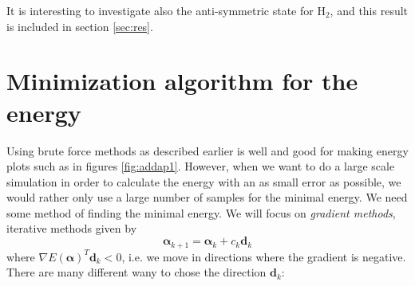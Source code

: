 \documentclass[aps,prc,twocolumn,floatfix]{revtex4}
\def\alphavec{\boldsymbol\alpha}
\def\dvec{\textbf{d}}
\begin{document}
It is interesting to investigate also the anti-symmetric state for $\text{H}_2$, and this result is included in section \ref{sec:res}. 


\section{Minimization algorithm for the energy}
\label{sec:minimize}

Using brute force methods as described earlier is well and good for making energy plots such as in figures \ref{fig:addap1}. However, when we want to do a large scale simulation in order to calculate the energy with an as small error as possible, we would rather only use a large number of samples for the minimal energy. We need some method of finding the minimal energy. We will focus on {\it gradient methods}, iterative methods given by 
 \begin{equation}
  \alphavec_{k+1} = \alphavec_k + c_k\dvec_k
 \end{equation}
where $\nabla E(\alphavec)^T \dvec_k < 0$, i.e. we move in directions where the gradient is negative. There are many different wany to chose the direction $\dvec_k$: 
\end{document}
